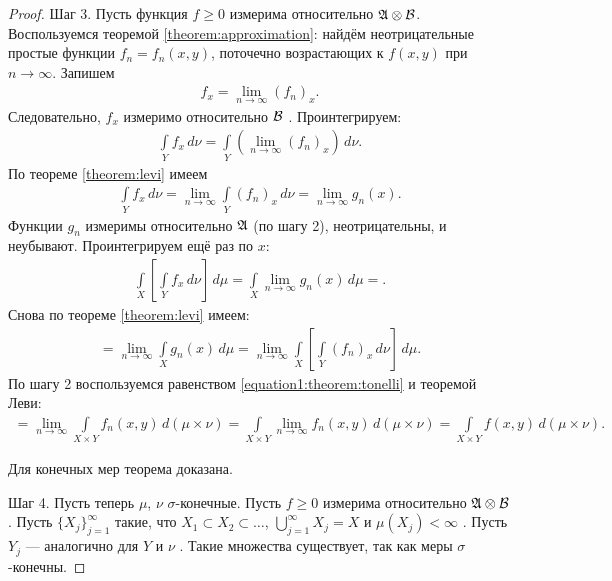 \begin{proof}
 Шаг 3. Пусть функция $f \geqslant 0$ измерима относительно $\mathfrak{A} \otimes \mathcal{B}$. Воспользуемся теоремой \ref{theorem:approximation}: найдём неотрицательные простые функции $f_n = f_n(x, y)$, поточечно возрастающих к $f(x, y)$ при $n \to \infty$. Запишем \begin{align*}
  f_x = \lim_{n \to \infty} (f_n)_x
 .\end{align*} Следовательно, $f_x$  измеримо относительно $\mathcal{B}$ . Проинтегрируем: \begin{align*}
  \int\limits_{Y} f_x \, d\nu = \int\limits_{Y} \left( \lim_{n \to \infty} (f_n)_x  \right) \, d\nu  
 .\end{align*} По теореме \ref{theorem:levi} имеем \begin{align*}
  \int\limits_{Y} f_x \, d\nu  = \lim_{n \to \infty} \int\limits_{Y} (f_n)_x \, d\nu    = \lim_{n \to \infty} g_n(x) 
 .\end{align*} Функции $g_n$  измеримы относительно $\mathfrak{A}$ (по шагу 2), неотрицательны, и неубывают. Проинтегрируем ещё раз по $x$: \begin{align*}
  \int\limits_{X} \left[ \int\limits_{Y} f_x \, d\nu   \right] \, d\mu = \int\limits_{X} \lim_{n \to \infty} g_n(x)  \, d\mu =  
 .\end{align*} Снова по теореме \ref{theorem:levi} имеем: \begin{align*}
  = \lim_{n \to \infty} \int\limits_{X} g_n(x) \, d\mu   = \lim_{n \to \infty} \int\limits_{X} \left[ \int\limits_{Y} (f_n)_x \, d\nu   \right] \, d\mu   
 .\end{align*} По шагу 2 воспользуемся равенством \eqref{equation1:theorem:tonelli} и теоремой Леви: \begin{align*}
  = \lim_{n \to \infty} \int\limits_{X \times Y} f_n(x, y) \, d(\mu \times \nu)   = \int\limits_{X \times Y} \lim_{n \to \infty} f_n(x,y)  \, d(\mu \times \nu) = \int\limits_{X \times Y} f(x,y) \, d(\mu \times \nu)   
 .\end{align*} 

 Для конечных мер теорема доказана.

 Шаг 4. Пусть теперь $\mu$, $\nu$ $\sigma$-конечные. Пусть $f \geqslant 0$ измерима относительно $\mathfrak{A} \otimes \mathcal{B}$. Пусть $\{X_{j}\}_{j=1}^{\infty} $ такие, что $X_1 \subset X_2 \subset \ldots$, $\bigcup_{j=1}^{\infty} X_j = X$ и $\mu(X_j) < \infty$ . Пусть  $Y_j$  --- аналогично для $Y$  и $\nu$ . Такие множества существует, так как меры $\sigma$-конечны.


\end{proof}
